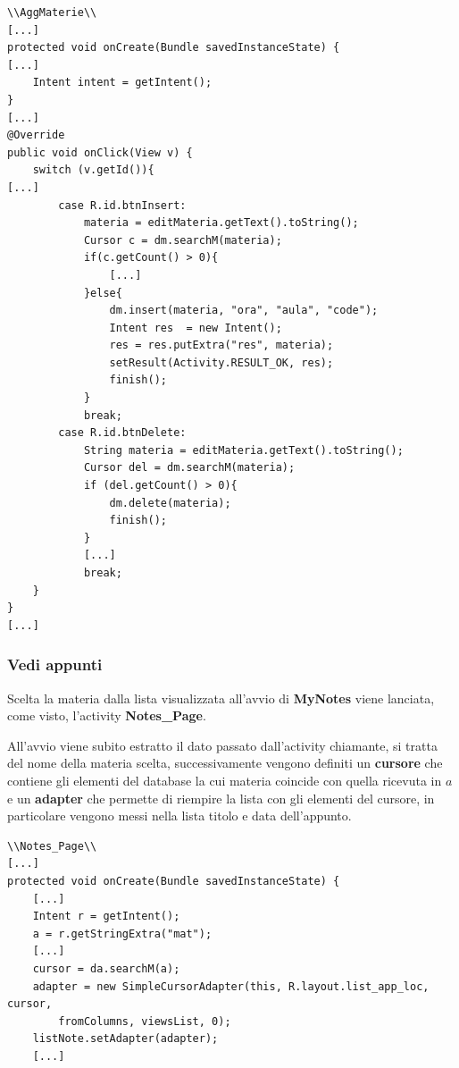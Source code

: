 \documentclass[a4paper, 50pt, twoside]{article}
\begin{document}
\begin{lstlisting}
\\AggMaterie\\
[...]
protected void onCreate(Bundle savedInstanceState) {
[...]
	Intent intent = getIntent();
}
[...]
@Override
public void onClick(View v) {
	switch (v.getId()){
[...]
		case R.id.btnInsert:
			materia = editMateria.getText().toString();
			Cursor c = dm.searchM(materia);
			if(c.getCount() > 0){
				[...]
			}else{
				dm.insert(materia, "ora", "aula", "code");
				Intent res  = new Intent();
				res = res.putExtra("res", materia);
				setResult(Activity.RESULT_OK, res);	
				finish();
			}
			break;
		case R.id.btnDelete:
			String materia = editMateria.getText().toString();
			Cursor del = dm.searchM(materia);
			if (del.getCount() > 0){
				dm.delete(materia);
				finish();
			}
			[...]
			break;
	}
}
[...]
\end{lstlisting}

\subsubsection{Vedi appunti}
Scelta la materia dalla lista visualizzata all'avvio di \textbf{MyNotes} viene lanciata, come visto, l'activity \textbf{Notes\_Page}.

All'avvio viene subito estratto il dato passato dall'activity chiamante, si tratta del nome della materia scelta, successivamente vengono definiti un \textbf{cursore} che contiene gli elementi del database la cui materia coincide con quella ricevuta in $a$ e un \textbf{adapter} che permette di riempire la lista con gli elementi del cursore, in particolare vengono messi nella lista titolo e data dell'appunto.

\begin{lstlisting}
\\Notes_Page\\
[...]
protected void onCreate(Bundle savedInstanceState) {
	[...]
	Intent r = getIntent();
	a = r.getStringExtra("mat");
	[...]
	cursor = da.searchM(a);
	adapter = new SimpleCursorAdapter(this, R.layout.list_app_loc, cursor,
		fromColumns, viewsList, 0);
	listNote.setAdapter(adapter);
	[...]
\end{lstlisting}
\end{document}
